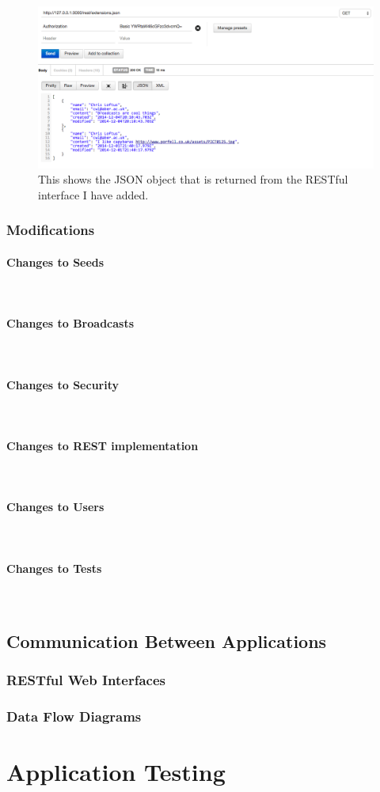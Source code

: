 \documentclass{article}
\newcommand{\myparagraph}[1]{\paragraph{#1}\mbox{}\\}
\begin{document}
\begin{figure}[H]
\centering
\includegraphics[width=\textwidth]{broadcastrest}
\caption{This shows the JSON object that is returned from the RESTful interface I have added.}
\end{figure}

\subsubsection{Modifications}

\myparagraph{Changes to Seeds}

\myparagraph{Changes to Broadcasts}

\myparagraph{Changes to Security}

\myparagraph{Changes to REST implementation}

\myparagraph{Changes to Users}

\myparagraph{Changes to Tests}

\subsection{Communication Between Applications}

\subsubsection{RESTful Web Interfaces}

\subsubsection{Data Flow Diagrams}


\newpage
\section{Application Testing}
\end{document}
